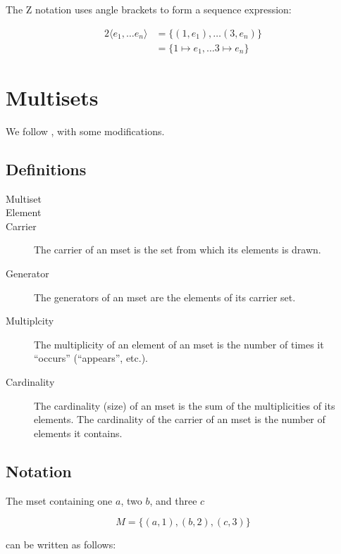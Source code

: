 \documentclass[reqno,12pt]{tufte-book}
\numberwithin{equation}{subsection}
\begin{document}
The Z notation uses angle brackets to form a sequence expression:

\begin{alignat}{2}
  \langle e_1,\ldots e_n\rangle &= \{(1,e_1),\ldots (3,e_n)\} \\
  &= \{1\mapsto e_1,\ldots 3\mapsto e_n\}
\end{alignat}

\section{Multisets}

We follow \citet{singh_overview_2007}, with some modifications.

\subsection{Definitions}

\begin{description}
\item [Multiset]
\item [Element]
\item [Carrier]  The carrier of an mset is the set from which its elements is drawn.
\item [Generator]  The generators of an mset are the elements of its carrier set.
\item [Multiplcity]  The multiplicity of an element of an mset is the number of times it ``occurs'' (``appears'', etc.).
\item [Cardinality] The cardinality (size) of an mset is the sum of
  the multiplicities of its elements.  The cardinality of the carrier of an mset is the number of elements it contains.
\end{description}

\subsection{Notation}

The mset containing one $a$, two $b$, and three $c$

\begin{equation}
  M = \{(a,1), (b,2), (c, 3)\}
\end{equation}

\noindent can be written as follows:
\end{document}
